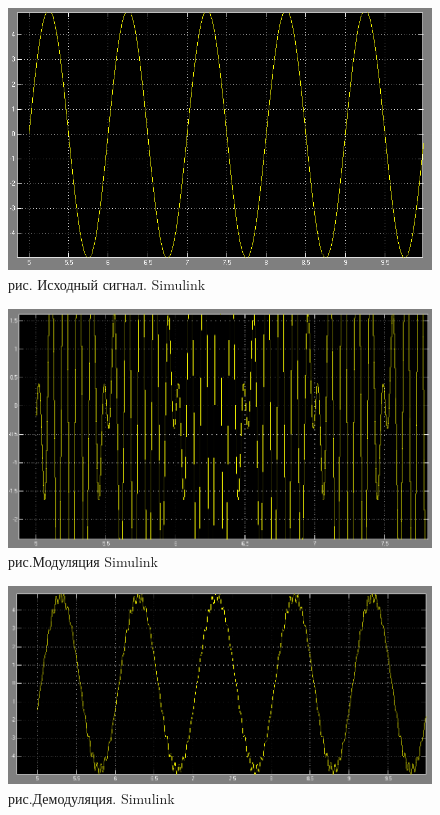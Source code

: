 \documentclass[10pt,a4paper]{report}
\begin{document}
\begin{figure}
\begin{center}
\includegraphics[angle=0, scale = 0.9]{7_11.png}\newline
рис. Исходный сигнал. Simulink\newline
\end{center}
\end{figure}
\begin{figure}
\begin{center}
\includegraphics[angle=0, scale = 0.9]{7_12.png}\newline
рис.Модуляция Simulink\newline
\end{center}
\end{figure}
\begin{figure}
\begin{center}
\includegraphics[angle=0, scale = 0.9]{7_13.png}\newline
рис.Демодуляция. Simulink\newline
\end{center}
\end{figure}
\end{document}
